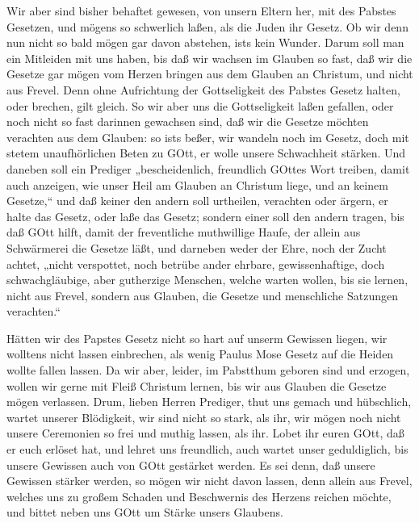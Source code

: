 Wir aber sind bisher behaftet gewesen, von unsern Eltern her, mit des Pabstes Gesetzen, und mögens so schwerlich laßen, als die Juden ihr Gesetz. Ob wir denn nun nicht so bald mögen gar davon abstehen, ists kein Wunder. Darum soll man ein Mitleiden mit uns haben, bis daß wir wachsen im Glauben so fast, daß wir die Gesetze gar mögen vom Herzen bringen aus dem Glauben an Christum, und nicht aus Frevel. Denn ohne Aufrichtung der Gottseligkeit des Pabstes Gesetz halten, oder brechen, gilt gleich. So wir aber uns die Gottseligkeit laßen gefallen, oder noch nicht so fast darinnen gewachsen sind, daß wir die Gesetze möchten verachten aus dem Glauben: so ists beßer, wir wandeln noch im Gesetz, doch mit stetem unaufhörlichen Beten zu GOtt, er wolle unsere Schwachheit stärken. Und daneben soll ein Prediger „bescheidenlich, freundlich GOttes Wort treiben, damit auch anzeigen, wie unser Heil am Glauben an Christum liege, und an keinem Gesetze,“ und daß keiner den andern soll urtheilen, verachten oder ärgern, er halte das Gesetz, oder laße das Gesetz; sondern einer soll den andern tragen, bis daß GOtt hilft, damit der freventliche muthwillige Haufe, der allein aus Schwärmerei die Gesetze läßt, und darneben weder der Ehre, noch der Zucht achtet, „nicht verspottet, noch betrübe ander ehrbare, gewissenhaftige, doch schwachgläubige, aber gutherzige Menschen, welche warten wollen, bis sie lernen, nicht aus Frevel, sondern aus Glauben, die Gesetze und menschliche Satzungen verachten.“

Hätten wir des Papstes Gesetz nicht so hart auf unserm Gewissen liegen, wir wolltens nicht lassen einbrechen, als wenig Paulus Mose Gesetz auf die Heiden wollte fallen lassen. Da wir aber, leider, im Pabstthum geboren sind und erzogen, wollen wir gerne mit Fleiß Christum lernen, bis wir aus Glauben die Gesetze mögen verlassen. Drum, lieben Herren Prediger, thut uns gemach und hübschlich, wartet unserer Blödigkeit, wir sind nicht so stark, als ihr, wir mögen noch nicht unsere Ceremonien so frei und muthig lassen, als ihr. Lobet ihr euren GOtt, daß er euch erlöset hat, und lehret uns freundlich, auch wartet unser geduldiglich, bis unsere Gewissen auch von GOtt gestärket werden. Es sei denn, daß unsere Gewissen stärker werden, so mögen wir nicht davon lassen, denn allein aus Frevel, welches uns zu großem Schaden und Beschwernis des Herzens reichen möchte, und bittet neben uns GOtt um Stärke unsers Glaubens.

